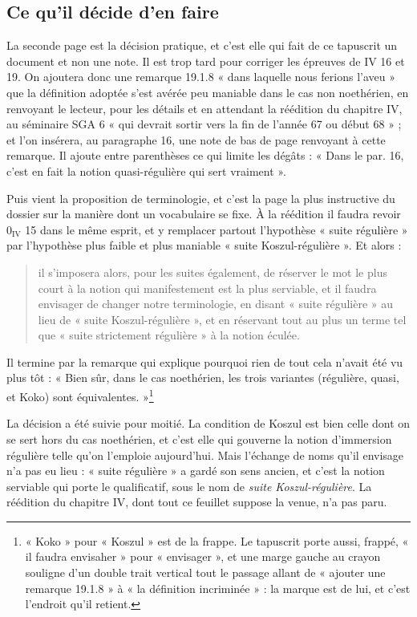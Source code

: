 \documentclass[11pt,a4paper]{article}
\begin{document}
\subsection*{Ce qu'il décide d'en faire}

La seconde page est la décision pratique, et c'est elle qui fait de ce
tapuscrit un document et non une note. Il est trop tard pour corriger les
épreuves de IV 16 et 19. On ajoutera donc une remarque 19.1.8 « dans laquelle
nous ferions l'aveu » que la définition adoptée s'est avérée peu maniable dans
le cas non noethérien, en renvoyant le lecteur, pour les détails et en attendant
la réédition du chapitre IV, au séminaire SGA 6 « qui devrait sortir vers la fin
de l'année 67 ou début 68 » ; et l'on insérera, au paragraphe 16, une note de
bas de page renvoyant à cette remarque. Il ajoute entre parenthèses ce qui
limite les dégâts : « Dans le par. 16, c'est en fait la notion quasi-régulière
qui sert vraiment ».

Puis vient la proposition de terminologie, et c'est la page la plus instructive
du dossier sur la manière dont un vocabulaire se fixe. À la réédition il faudra
revoir $0_{\mathrm{IV}}$ 15 dans le même esprit, et y remplacer partout
l'hypothèse « suite régulière » par l'hypothèse plus faible et plus maniable
« suite Koszul-régulière ». Et alors :

\begin{quote}
il s'imposera alors, pour les suites également, de réserver le mot le plus court
à la notion qui manifestement est la plus serviable, et il faudra envisager de
changer notre terminologie, en disant « suite régulière » au lieu de « suite
Koszul-régulière », et en réservant tout au plus un terme tel que « suite
strictement régulière » à la notion éculée.
\end{quote}

Il termine par la remarque qui explique pourquoi rien de tout cela n'avait été
vu plus tôt : « Bien sûr, dans le cas noethérien, les trois variantes
(régulière, quasi, et Koko) sont équivalentes. »\footnote{« Koko » pour
« Koszul » est de la frappe. Le tapuscrit porte aussi, frappé, « il faudra
envisaher » pour « envisager », et une marge gauche au crayon souligne d'un
double trait vertical tout le passage allant de « ajouter une remarque 19.1.8 »
à « la définition incriminée » : la marque est de lui, et c'est l'endroit qu'il
retient.}

La décision a été suivie pour moitié. La condition de Koszul est bien celle
dont on se sert hors du cas noethérien, et c'est elle qui gouverne la notion
d'immersion régulière telle qu'on l'emploie aujourd'hui. Mais l'échange de noms
qu'il envisage n'a pas eu lieu : « suite régulière » a gardé son sens ancien, et
c'est la notion serviable qui porte le qualificatif, sous le nom de \emph{suite
Koszul-régulière}. La réédition du chapitre IV, dont tout ce feuillet suppose
la venue, n'a pas paru.
\end{document}
